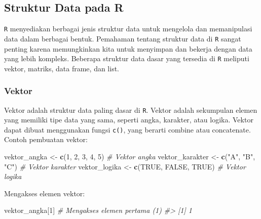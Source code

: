 \documentclass[
  oneside]{book}
\newenvironment{Shaded}{\begin{snugshade}}{\end{snugshade}}
\newcommand{\CommentTok}[1]{\textcolor[rgb]{0.56,0.35,0.01}{\textit{#1}}}
\newcommand{\ConstantTok}[1]{\textcolor[rgb]{0.56,0.35,0.01}{#1}}
\newcommand{\DecValTok}[1]{\textcolor[rgb]{0.00,0.00,0.81}{#1}}
\newcommand{\FunctionTok}[1]{\textcolor[rgb]{0.13,0.29,0.53}{\textbf{#1}}}
\newcommand{\NormalTok}[1]{#1}
\newcommand{\OtherTok}[1]{\textcolor[rgb]{0.56,0.35,0.01}{#1}}
\newcommand{\StringTok}[1]{\textcolor[rgb]{0.31,0.60,0.02}{#1}}
\begin{document}
\subsection*{Struktur Data pada R}\label{struktur-data-pada-r}

\texttt{R} menyediakan berbagai jenis struktur data untuk mengelola
dan memanipulasi data dalam berbagai bentuk. Pemahaman tentang struktur
data di \texttt{R} sangat penting karena memungkinkan kita untuk
menyimpan dan bekerja dengan data yang lebih kompleks. Beberapa struktur
data dasar yang tersedia di \texttt{R} meliputi vektor, matriks,
data frame, dan list.

\subsubsection*{Vektor}\label{vektor}

Vektor adalah struktur data paling dasar di \texttt{R}. Vektor adalah sekumpulan elemen yang memiliki tipe data yang sama, seperti angka, karakter, atau logika. Vektor dapat dibuat menggunakan fungsi \texttt{c()}, yang berarti combine atau concatenate. Contoh pembuatan vektor:

\begin{Shaded}
\begin{Highlighting}[]
\NormalTok{vektor\_angka }\OtherTok{\textless{}{-}} \FunctionTok{c}\NormalTok{(}\DecValTok{1}\NormalTok{, }\DecValTok{2}\NormalTok{, }\DecValTok{3}\NormalTok{, }\DecValTok{4}\NormalTok{, }\DecValTok{5}\NormalTok{)      }\CommentTok{\# Vektor angka}
\NormalTok{vektor\_karakter }\OtherTok{\textless{}{-}} \FunctionTok{c}\NormalTok{(}\StringTok{"A"}\NormalTok{, }\StringTok{"B"}\NormalTok{, }\StringTok{"C"}\NormalTok{)   }\CommentTok{\# Vektor karakter}
\NormalTok{vektor\_logika }\OtherTok{\textless{}{-}} \FunctionTok{c}\NormalTok{(}\ConstantTok{TRUE}\NormalTok{, }\ConstantTok{FALSE}\NormalTok{, }\ConstantTok{TRUE}\NormalTok{)  }\CommentTok{\# Vektor logika}
\end{Highlighting}
\end{Shaded}

Mengakses elemen vektor:

\begin{Shaded}
\begin{Highlighting}[]
\NormalTok{vektor\_angka[}\DecValTok{1}\NormalTok{]   }\CommentTok{\# Mengakses elemen pertama (1)}
\CommentTok{\#\textgreater{} [1] 1}
\end{Highlighting}
\end{Shaded}
\end{document}
